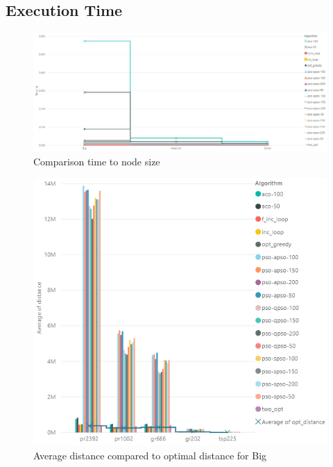 \documentclass[conference]{IEEEtran}
\begin{document}
    \subsection{Execution Time}
	    
	  \begin{figure}[h]
    		\centering
    		\includegraphics[width=\columnwidth]{time_goupNodeSize.png}
    		\caption{Comparison time to node size}
    		\label{fig:boxPlotTime}
	    \end{figure}
	   
	  \begin{figure}[h]
    		\centering
    		\includegraphics[width=\columnwidth]{distance_opt_dostance_big.png}
    		\caption{Average distance compared to optimal distance for Big}
    		\label{fig:distanceBig}
	    \end{figure}
	    
\end{document}
